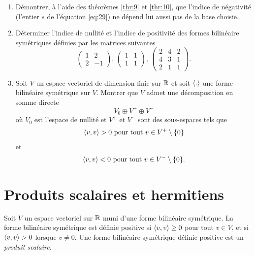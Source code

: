 \begin{enumerate}
\item Démontrer, à l'aide des théorèmes \ref{thr:9} et \ref{thr:10}, que l'indice de négativité (l'entier $s$ de l'équation \eqref{eq:29}) ne dépend lui aussi pas de la base choisie.
\item Déterminer l'indice de nullité et l'indice de positivité des 
formes bilinéaire symétriques 
 définies par les matrices suivantes
  \begin{displaymath}
    \begin{pmatrix}
      1 & 2 \\
      2 & -1
    \end{pmatrix}
    , \,
    \begin{pmatrix}
      1 & 1 \\
      1 & 1
    \end{pmatrix}, \, 
    \begin{pmatrix}
      2 & 4 & 2 \\
      4 & 3 &  1 \\ 
      2 & 1 &1
    \end{pmatrix}. 
  \end{displaymath}

\item Soit $V$ un espace vectoriel de dimension finie sur $\mathbb{R}$ et soit $\langle {.} \rangle$ une forme bilinéaire symétrique  sur $V$.  Montrer que $V$ admet une décomposition en somme directe 
  \begin{displaymath}
    V_0 \oplus V^+ \oplus V^-
  \end{displaymath}
où $V_0$ est l'espace de nullité et $V^+$ et $V^-$ sont des sous-espaces tels que 
\begin{displaymath}
  \langle {v,v} \rangle >0 \text{ pour tout } v \in V^+ \setminus\{0\}
\end{displaymath}
et  
\begin{displaymath}
  \langle {v,v} \rangle <0 \text{ pour tout } v \in V^- \setminus\{0\}. 
\end{displaymath}
\end{enumerate}






\chapter{Produits scalaires et hermitiens}
\label{sec:le-case-reel}




\begin{definition}
  \label{def:4}
  Soit $V$ un espace vectoriel sur $\mathbb{R}$ muni 
  d'une forme bilinéaire symétrique. 
  La forme bilinéaire symétrique  est définie positive si $\langle {v,v} \rangle \geq 0$ pour tout $v \in V$, et si $\langle {v,v} \rangle>0$ lorsque $v \neq 0$. Une forme bilinéaire symétrique définie positive est un \emph{produit scalaire}. 
\end{definition}

